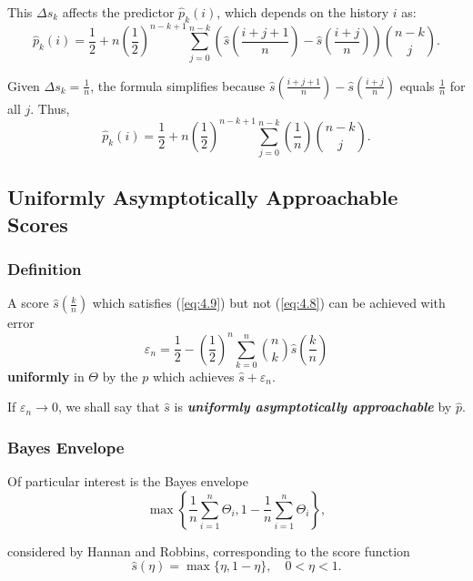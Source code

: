 \documentclass[11pt]{article}
\numberwithin{equation}{section}
\theoremstyle{boldStyle}
\begin{document}
This $\Delta s_k$ affects the predictor $\hat{p}_k(i)$, which depends on the history $i$ as:
\[
\hat{p}_k(i) = \frac{1}{2} + n \left(\frac{1}{2}\right)^{n-k+1} \sum_{j=0}^{n-k} \left(\hat{s} \left( \frac{i+j+1}{n} \right) - \hat{s} \left( \frac{i+j}{n} \right) \right) \binom{n-k}{j}.
\]

Given $\Delta s_k = \frac{1}{n}$, the formula simplifies because $\hat{s} \left( \frac{i+j+1}{n} \right) - \hat{s} \left( \frac{i+j}{n} \right)$ equals $\frac{1}{n}$ for all $j$. Thus,
\[
\hat{p}_k(i) = \frac{1}{2} + n \left(\frac{1}{2}\right)^{n-k+1} \sum_{j=0}^{n-k} \left(\frac{1}{n}\right) \binom{n-k}{j}.
\]


\subsection{Uniformly Asymptotically Approachable Scores}

\subsubsection{Definition}

A score $\hat{s}(\frac{k}{n})$ which satisfies (\ref{eq:4.9}) but not (\ref{eq:4.8}) can be achieved with error 
\begin{equation} \label{eq:4.12}
    \varepsilon_n = \frac{1}{2} - \left(\frac{1}{2}\right)^n \sum_{k=0}^n \binom{n}{k} \hat{s} \left(\frac{k}{n}\right)
\end{equation}
\textbf{uniformly} in $\Theta$ by the $p$ which achieves $\hat{s} + \varepsilon_n$.

If $\varepsilon_n \rightarrow 0$, we shall say that $\hat{s}$ is \textbf{\textit{uniformly asymptotically approachable}} by $\hat{p}$.

\subsubsection{Bayes Envelope}

Of particular interest is the Bayes envelope 
\begin{equation*} 
    \max \left\{ \frac{1}{n} \sum_{i=1}^n \Theta_i, 1 - \frac{1}{n} \sum_{i=1}^n \Theta_i \right\},
\end{equation*}

considered by Hannan and Robbins, corresponding to the score function
\begin{equation} \label{eq:4.13}
    \hat{s}(\eta) = \max \{\eta, 1 - \eta\}, \quad 0 < \eta < 1.
\end{equation}
\end{document}
